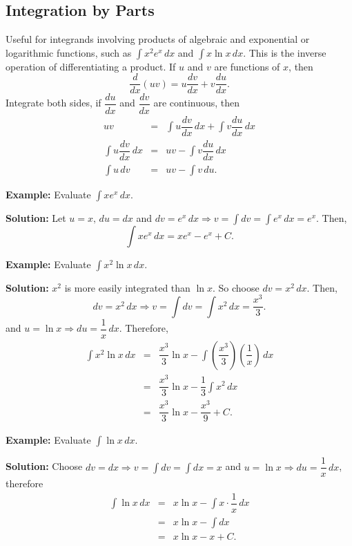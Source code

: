 \documentclass[titlepage,a4paper,12pt]{report}
\begin{document}
\subsection{Integration by Parts}
Useful for integrands involving products of algebraic and exponential or logarithmic functions, such as $\displaystyle \int x^2e^x\, dx$ and $\displaystyle \int x\ln x\, dx$. This is the inverse operation of differentiating a product. If $u$ and $v$ are functions of $x$, then 
\begin{equation*}
\dfrac{d}{dx}(uv)=u\dfrac{dv}{dx}+v\dfrac{du}{dx}.
\end{equation*}
Integrate both sides, if $\dfrac{du}{dx}$ and $\dfrac{dv}{dx}$ are continuous, then 
\begin{eqnarray*}
uv &=& \int u\dfrac{dv}{dx}\, dx +\int v\dfrac{du}{dx}\, dx \\
\int u \dfrac{dv}{dx}\, dx &=& uv -\int v\dfrac{du}{dx}\, dx \\
\int u \, dv &=& uv -\int v\, du.
\end{eqnarray*}

\noindent \textbf{Example:} Evaluate $\displaystyle \int xe^x \, dx$.

\noindent \textbf{Solution:} Let $u=x, \, du=dx$ and $dv=e^x\, dx\Rightarrow v=\displaystyle \int dv=\int e^x\, dx=e^x$. Then, 
\begin{equation*}
\int xe^x \, dx=xe^x-e^x+C.
\end{equation*}

\noindent \textbf{Example:} Evaluate $\displaystyle \int x^2 \ln x\, dx$.

\noindent \textbf{Solution:} $x^2$ is more easily integrated than $\ln x$. So choose $dv=x^2\, dx$. Then, 
\begin{equation*}
dv=x^2\, dx \Rightarrow v=\int dv =\int x^2 \, dx =\dfrac{x^3}{3}.
\end{equation*}
and $u=\ln x \Rightarrow du=\dfrac{1}{x}\, dx$. Therefore, 
\begin{eqnarray*}
\int x^2 \ln x\, dx &=& \dfrac{x^3}{3}\ln x -\int \left(\dfrac{x^3}{3}\right)\left(\dfrac{1}{x}\right)\, dx\\
&=& \dfrac{x^3}{3}\ln x -\dfrac{1}{3}\int x^2\, dx \\
&=&  \dfrac{x^3}{3}\ln x -\dfrac{x^3}{9}+C.
\end{eqnarray*}

\noindent \textbf{Example:} Evaluate $\displaystyle \int \ln x \, dx$.

\noindent \textbf{Solution:} Choose $dv=dx \Rightarrow v=\displaystyle \int dv=\int dx=x$ and $u=\ln x\Rightarrow du=\dfrac{1}{x}\, dx$, therefore
\begin{eqnarray*}
\int \ln x\, dx &=& x\ln x -\int x\cdot \dfrac{1}{x}\, dx \\
&=& x\ln x -\int dx\\
&=&x\ln x -x+C.
\end{eqnarray*}
\end{document}
